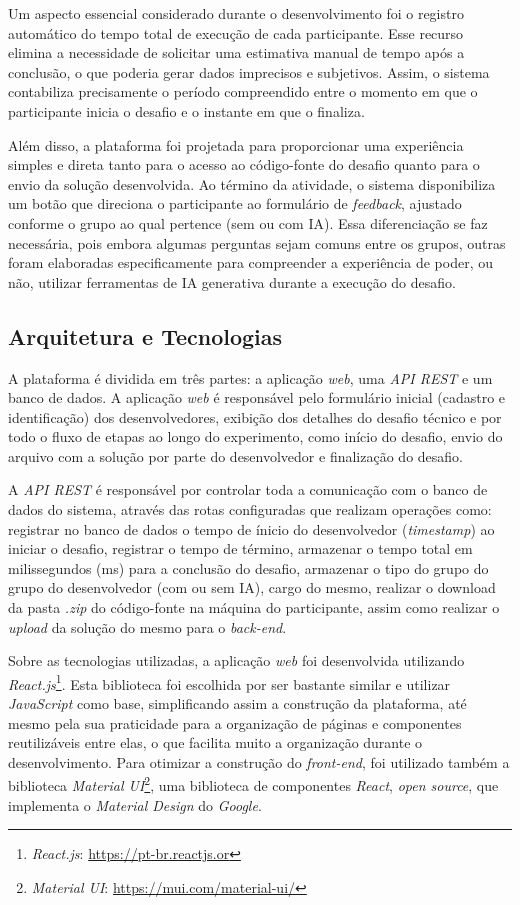 \documentclass[english,brazilian]{UNISINOSartigo} %
\begin{document}
Um aspecto essencial considerado durante o desenvolvimento foi o registro automático do tempo total de execução de cada participante. Esse recurso elimina a necessidade de solicitar uma estimativa manual de tempo após a conclusão, o que poderia gerar dados imprecisos e subjetivos. Assim, o sistema contabiliza precisamente o período compreendido entre o momento em que o participante inicia o desafio e o instante em que o finaliza.

Além disso, a plataforma foi projetada para proporcionar uma experiência simples e direta tanto para o acesso ao código-fonte do desafio quanto para o envio da solução desenvolvida. Ao término da atividade, o sistema disponibiliza um botão que direciona o participante ao formulário de \textit{feedback}, ajustado conforme o grupo ao qual pertence (sem ou com IA). Essa diferenciação se faz necessária, pois embora algumas perguntas sejam comuns entre os grupos, outras foram elaboradas especificamente para compreender a experiência de poder, ou não, utilizar ferramentas de IA generativa durante a execução do desafio.

\subsection{Arquitetura e Tecnologias}

A plataforma é dividida em três partes: a aplicação \textit{web}, uma \textit{API REST} e um banco de dados. A aplicação \textit{web} é responsável pelo formulário inicial (cadastro e identificação) dos desenvolvedores, exibição dos detalhes do desafio técnico e por todo o fluxo de etapas ao longo do experimento, como início do desafio, envio do arquivo com a solução por parte do desenvolvedor e finalização do desafio.

A \textit{API REST} é responsável por controlar toda a comunicação com o banco de dados do sistema, através das rotas configuradas que realizam operações como: registrar no banco de dados o tempo de ínicio do desenvolvedor (\textit{timestamp}) ao iniciar o desafio, registrar o tempo de término, armazenar o tempo total em milissegundos (ms) para a conclusão do desafio, armazenar o tipo do grupo do grupo do desenvolvedor (com ou sem IA), cargo do mesmo, realizar o download da pasta \textit{.zip} do código-fonte na máquina do participante, assim como realizar o \textit{upload} da solução do mesmo para o \textit{back-end}.

Sobre as tecnologias utilizadas, a aplicação \textit{web} foi desenvolvida utilizando \textit{React.js}\footnote{\textit{React.js}: \url{https://pt-br.reactjs.or}}. Esta biblioteca foi escolhida por ser bastante similar e utilizar \textit{JavaScript} como base, simplificando assim a construção da plataforma, até mesmo pela sua praticidade para a organização de páginas e componentes reutilizáveis entre elas, o que facilita muito a organização durante o desenvolvimento. Para otimizar a construção do \textit{front-end}, foi utilizado também a biblioteca \textit{Material UI}\footnote{\textit{Material UI}: \url{https://mui.com/material-ui/}}, uma biblioteca de componentes \textit{React}, \textit{open source}, que implementa o \textit{Material Design} do \textit{Google}.
\end{document}
